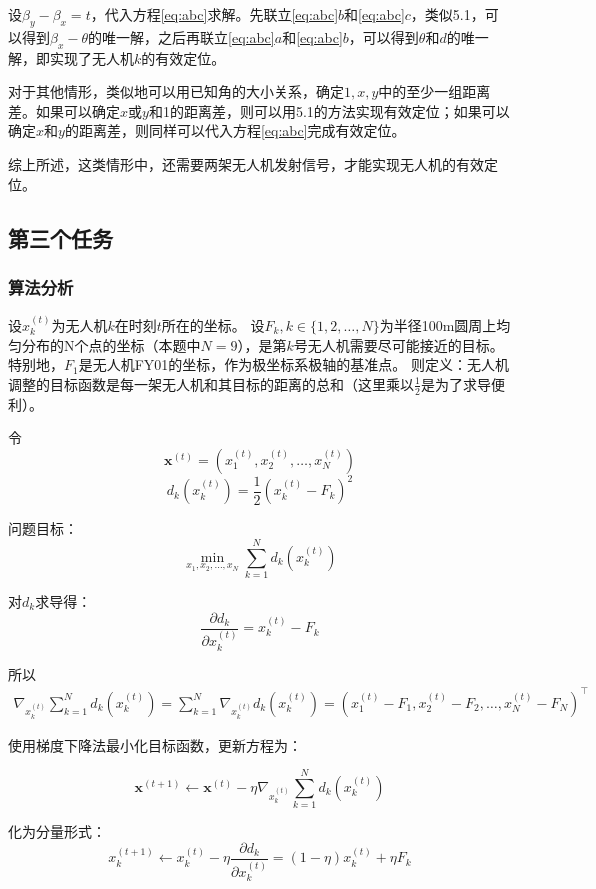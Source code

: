 \documentclass[withoutpreface,bwprint]{cumcmthesis} %
\begin{document}
设$\beta_y-\beta_x=t$，代入方程\ref{eq:abc}求解。先联立\ref{eq:abc}$b$和\ref{eq:abc}$c$，类似5.1，可以得到$\beta_x-\theta$的唯一解，之后再联立\ref{eq:abc}$a$和\ref{eq:abc}$b$，可以得到$\theta$和$d$的唯一解，即实现了无人机$k$的有效定位。

对于其他情形，类似地可以用已知角的大小关系，确定$1,x,y$中的至少一组距离差。如果可以确定$x$或$y$和1的距离差，则可以用5.1的方法实现有效定位；如果可以确定$x$和$y$的距离差，则同样可以代入方程\ref{eq:abc}完成有效定位。

综上所述，这类情形中，还需要两架无人机发射信号，才能实现无人机的有效定位。

\subsection{第三个任务}
\subsubsection{算法分析}
设$x_k^{(t)}$为无人机$k$在时刻$t$所在的坐标。
设$F_k,k\in \{1,2,\dots, N\}$为半径100m圆周上均匀分布的N个点的坐标（本题中$N=9$），是第$k$号无人机需要尽可能接近的目标。特别地，$F_1$是无人机FY01的坐标，作为极坐标系极轴的基准点。
则定义：无人机调整的目标函数是每一架无人机和其目标的距离的总和（这里乘以$\frac{1}{2}$是为了求导便利）。

令
$$\textbf{x}^{(t)}=(x_1^{(t)},x_2^{(t)}, \dots, x_N^{(t)})$$
$$d_k(x_k^{(t)}) = \frac{1}{2} (x_k^{(t)}-F_k)^2$$

问题目标：
\begin{equation}
    \min_{x_1,x_2,\dots, x_N}  \sum_{k=1}^N d_k(x_k^{(t)})
\end{equation}

对$d_k$求导得：
$$\frac{\partial d_k}{\partial x_k^{(t)}}= x_k^{(t)} - F_k$$

所以
\begin{gather*}
    \nabla_{x_k^{(t)}} \sum_{k=1}^N d_k(x_k^{(t)}) 
    = \sum_{k=1}^N \nabla_{x_k^{(t)}}  d_k(x_k^{(t)}) 
    = (x_1^{(t)} - F_1, x_2^{(t)} - F_2, \dots, x_N^{(t)} - F_N)^\top
\end{gather*}

使用梯度下降法最小化目标函数，更新方程为：

\begin{equation}
    \textbf{x}^{(t+1)} \gets \textbf{x}^{(t)} - \eta \nabla_{x_k^{(t)}} \sum_{k=1}^N d_k(x_k^{(t)}) 
\end{equation}

化为分量形式：
\begin{equation}\label{gd_k}
    x_k^{(t+1)} \gets x_k^{(t)} - \eta \frac{\partial d_k}{\partial x_k^{(t)}} = (1-\eta) x_k^{(t)} + \eta F_k
\end{equation}
\end{document}
